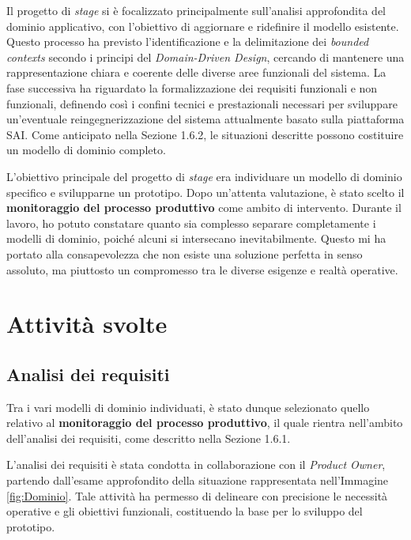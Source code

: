     \vspace{0.2 em}
    \noindent Il progetto di \textit{stage} si è focalizzato principalmente sull’analisi approfondita del dominio applicativo, con l’obiettivo di aggiornare e ridefinire il modello esistente. Questo processo ha previsto l’identificazione e la delimitazione dei \textit{bounded contexts} secondo i principi del \textit{Domain-Driven Design}, cercando di mantenere una rappresentazione chiara e coerente delle diverse aree funzionali del sistema. La fase successiva ha riguardato la formalizzazione dei requisiti funzionali e non funzionali, definendo così i confini tecnici e prestazionali necessari per sviluppare un’eventuale reingegnerizzazione del sistema attualmente basato sulla piattaforma SAI. Come anticipato nella Sezione 1.6.2, le situazioni descritte possono costituire un modello di dominio completo.  

    \vspace{0.2 em}
    \noindent L’obiettivo principale del progetto di \textit{stage} era individuare un modello di dominio specifico e svilupparne un prototipo. Dopo un’attenta valutazione, è stato scelto il \textbf{monitoraggio del processo produttivo} come ambito di intervento. Durante il lavoro, ho potuto constatare quanto sia complesso separare completamente i modelli di dominio, poiché alcuni si intersecano inevitabilmente. Questo mi ha portato alla consapevolezza che non esiste una soluzione perfetta in senso assoluto, ma piuttosto un compromesso tra le diverse esigenze e realtà operative. 
    
    
    \section{Attività svolte}
        \subsection{Analisi dei requisiti}
        Tra i vari modelli di dominio individuati, è stato dunque selezionato quello relativo al \textbf{monitoraggio del processo produttivo}, il quale rientra nell’ambito dell’analisi dei requisiti, come descritto nella Sezione 1.6.1. 

        \vspace{0.2 em}
        \noindent L’analisi dei requisiti è stata condotta in collaborazione con il \textit{Product Owner}, partendo dall’esame approfondito della situazione rappresentata nell’Immagine \ref{fig:Dominio}. Tale attività ha permesso di delineare con precisione le necessità operative e gli obiettivi funzionali, costituendo la base per lo sviluppo del prototipo.

